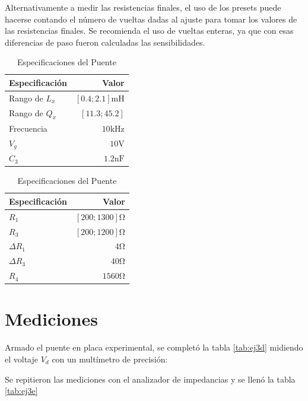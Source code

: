     Alternativamente a medir las resistencias finales, el uso de los presets puede hacerse
    contando el número de vueltas dadas al ajuste para tomar los valores de las resistencias
    finales. Se recomienda el uso de vueltas enteras, ya que con esas diferencias de paso
    fueron calculadas las sensibilidades.

    \begin{table}[h]
        \begin{center}
            \begin{tabular}{|l|r|}
                \hline
                Especificación & Valor \\
                \hline
                Rango de $L_x$ & $[0.4;2.1]\si{\milli\henry}$ \\
                Rango de $Q_x$ & $ [11.3; 45.2] $ \\
                Frecuencia & $10\si{\kilo\hertz}$\\
                $V_g$ & $10\si{\volt}$\\
                $C_3$ & $1.2\si{\nano\farad}$\\
                \hline
            \end{tabular}
            \begin{tabular}{|l|r|}
                \hline
                Especificación & Valor \\
                \hline
                $R_1$ & $[200;1300]\si{\ohm}$\\
                $R_3$ & $[200;1200]\si{\ohm}$\\
                $\Delta R_1$ & $4\si{\ohm}$ \\
                $\Delta R_3$ & $40\si{\ohm}$ \\
                $R_4$ & $1560\si{\ohm}$\\
                \hline
            \end{tabular}
            \caption{Especificaciones del Puente}
            \label{tab:ej3specFin}
        \end{center}
    \end{table}

    \section{Mediciones}
    Armado el puente en placa experimental, se completó la tabla \ref{tab:ej3d} midiendo el voltaje $V_d$
    con un multímetro de precisión:
    

    Se repitieron las mediciones con el analizador de impedancias y se llenó la tabla \ref{tab:ej3e}
    

